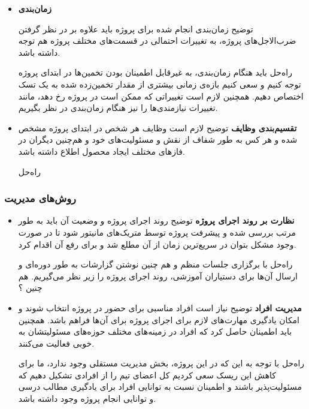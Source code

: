 \begin{itemize}
	
	
\item 
\textbf{زمان‌بندی}

توضیح \hspace*{1cm} 
زمان‌بندی انجام شده برای پروژه باید علاوه بر در نظر گرفتن ضرب‌الاجل‌های پروژه، به تغییرات احتمالی در قسمت‌های مختلف پروژه هم توجه داشته باشد.

راه‌حل \hspace*{1cm} 
باید هنگام زمان‌بندی، به غیرقابل اطمینان بودن تخمین‌ها در ابتدای پروژه توجه کنیم و سعی کنیم بازه‌ی زمانی بیشتری از مقدار تخمین‌زده شده به یک تسک اختصاص دهیم. همچنین لازم است تغییراتی که ممکن است در پروژه رخ دهد، مانند تغییرات نیازمندی‌ها را نیز هنگام زمان‌بندی در نظر بگیریم.


\item 
\textbf{تقسیم‌بندی وظایف‌}
توضیح \hspace*{1cm} 
	لازم است وظایف هر شخص در ابتدای پروژه مشخص شده و هر کس به طور شفاف از نقش و مسئولیت‌های خود و هم‌چنین دیگران در فازهای مختلف ایجاد محصول اطلاع داشته باشد.

راه‌حل \hspace*{1cm} 
	
\end{itemize}

\subsubsection{روش‌های مدیریت}


\begin{itemize}
	
	\item 
	\textbf{نظارت بر روند اجرای پروژه‌}
	توضیح \hspace*{1cm} 
	روند اجرای پروژه و وضعیت آن باید به طور مرتب بررسی شده و پیشرفت پروژه توسط متریک‌های مانیتور شود تا در صورت وجود مشکل بتوان در سریع‌ترین زمان از آن مطلع شد و برای رفع آن اقدام کرد.
	
	راه‌حل \hspace*{1cm} 
	با برگزاری جلسات منظم و هم چنین نوشتن گزارشات به طور دوره‌ای و ارسال آن‌ها برای دستیاران آموزشی، روند اجرای پروژه را زیر نظر می‌گیریم.
هم چنین ؟
	
\item 
\textbf{مدیریت افراد‌}
توضیح \hspace*{1cm} 
نیاز است افراد مناسبی برای حضور در پروژه انتخاب شوند و امکان یادگیری مهارت‌های لازم برای اجرای پروژه برای آن‌ها فراهم باشد. همچنین باید اطمینان حاصل کرد که افراد در زمینه‌های مختلف حوزه‌های مسئولیتشان به خوبی فعالیت می‌کنند.

راه‌حل \hspace*{1cm} 
با توجه به این که در این پروژه، بخش مدیریت مستقلی وجود ندارد، ما برای کاهش این ریسک سعی کردیم کل اعضای تیم را از افرادی تشکیل دهیم که مسئولیت‌پذیر باشند و اطمینان نسبت به توانایی‌ افراد برای یادگیری مطالب درسی و توانایی انجام پروژه وجود داشته باشد.


\end{itemize}

